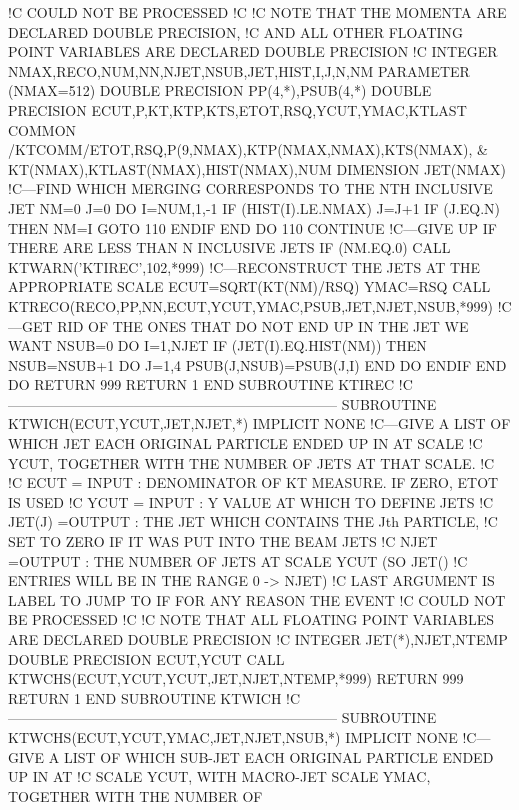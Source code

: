 !C   COULD NOT BE PROCESSED
!C
!C   NOTE THAT THE MOMENTA ARE DECLARED DOUBLE PRECISION,
!C   AND ALL OTHER FLOATING POINT VARIABLES ARE DECLARED DOUBLE PRECISION
!C
      INTEGER NMAX,RECO,NUM,NN,NJET,NSUB,JET,HIST,I,J,N,NM
      PARAMETER (NMAX=512)
      DOUBLE PRECISION PP(4,*),PSUB(4,*)
      DOUBLE PRECISION ECUT,P,KT,KTP,KTS,ETOT,RSQ,YCUT,YMAC,KTLAST
      COMMON /KTCOMM/ETOT,RSQ,P(9,NMAX),KTP(NMAX,NMAX),KTS(NMAX), &
           KT(NMAX),KTLAST(NMAX),HIST(NMAX),NUM
      DIMENSION JET(NMAX)
!C---FIND WHICH MERGING CORRESPONDS TO THE NTH INCLUSIVE JET
      NM=0
      J=0
      DO I=NUM,1,-1
         IF (HIST(I).LE.NMAX) J=J+1
         IF (J.EQ.N) THEN
            NM=I
            GOTO 110
         ENDIF
      END DO
110   CONTINUE
!C---GIVE UP IF THERE ARE LESS THAN N INCLUSIVE JETS
      IF (NM.EQ.0) CALL KTWARN('KTIREC',102,*999)
!C---RECONSTRUCT THE JETS AT THE APPROPRIATE SCALE
      ECUT=SQRT(KT(NM)/RSQ)
      YMAC=RSQ
      CALL KTRECO(RECO,PP,NN,ECUT,YCUT,YMAC,PSUB,JET,NJET,NSUB,*999)
!C---GET RID OF THE ONES THAT DO NOT END UP IN THE JET WE WANT
      NSUB=0
      DO I=1,NJET
         IF (JET(I).EQ.HIST(NM)) THEN
            NSUB=NSUB+1
            DO J=1,4
               PSUB(J,NSUB)=PSUB(J,I)
            END DO
         ENDIF
      END DO
      RETURN
999   RETURN 1
    END SUBROUTINE KTIREC
!C-----------------------------------------------------------------------
    SUBROUTINE KTWICH(ECUT,YCUT,JET,NJET,*)
      IMPLICIT NONE
!C---GIVE A LIST OF WHICH JET EACH ORIGINAL PARTICLE ENDED UP IN AT SCALE
!C   YCUT, TOGETHER WITH THE NUMBER OF JETS AT THAT SCALE.
!C
!C   ECUT     = INPUT : DENOMINATOR OF KT MEASURE. IF ZERO, ETOT IS USED
!C   YCUT     = INPUT : Y VALUE AT WHICH TO DEFINE JETS
!C   JET(J)   =OUTPUT : THE JET WHICH CONTAINS THE Jth PARTICLE,
!C                        SET TO ZERO IF IT WAS PUT INTO THE BEAM JETS
!C   NJET     =OUTPUT : THE NUMBER OF JETS AT SCALE YCUT (SO JET()
!C                        ENTRIES WILL BE IN THE RANGE 0 -> NJET)
!C   LAST ARGUMENT IS LABEL TO JUMP TO IF FOR ANY REASON THE EVENT
!C   COULD NOT BE PROCESSED
!C
!C   NOTE THAT ALL FLOATING POINT VARIABLES ARE DECLARED DOUBLE PRECISION
!C
      INTEGER JET(*),NJET,NTEMP
      DOUBLE PRECISION ECUT,YCUT
      CALL KTWCHS(ECUT,YCUT,YCUT,JET,NJET,NTEMP,*999)
      RETURN
 999  RETURN 1
    END SUBROUTINE KTWICH
!C-----------------------------------------------------------------------
    SUBROUTINE KTWCHS(ECUT,YCUT,YMAC,JET,NJET,NSUB,*)
      IMPLICIT NONE
!C---GIVE A LIST OF WHICH SUB-JET EACH ORIGINAL PARTICLE ENDED UP IN AT
!C   SCALE YCUT, WITH MACRO-JET SCALE YMAC, TOGETHER WITH THE NUMBER OF
